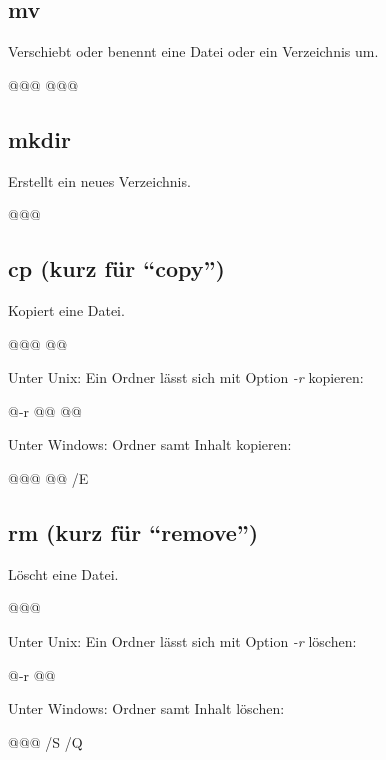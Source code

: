 \subsection{mv}
Verschiebt oder benennt eine Datei oder ein Verzeichnis um.
\begin{commandshell}
@\shellprefix@mv @\textit{}@
@\shellprefix@mv @\textit{}@
\end{commandshell}

\subsection{mkdir}
Erstellt ein neues Verzeichnis.
\begin{commandshell}
    @\shellprefix@mkdir @\textit{}@
\end{commandshell}

\subsection{cp (kurz für \enquote{copy})}
Kopiert eine Datei.
\begin{commandshell}
    @\shellprefix@cp @\textit{}@ @\textit{}@
\end{commandshell}
Unter Unix: Ein Ordner lässt sich mit Option \textit{-r} kopieren:
\begin{commandshell}
    @\shellprefix@cp -r @\textit{}@ @\textit{}@
\end{commandshell}
Unter Windows: Ordner samt Inhalt kopieren:
\begin{commandshell}[][minted language=batch]
    @\shellprefix@xcopy @\textit{}@ @\textit{}@ /E
\end{commandshell}

\subsection{rm (kurz für \enquote{remove})}
Löscht eine Datei.
\begin{commandshell}
    @\shellprefix@rm @\textit{}@
\end{commandshell}
Unter Unix: Ein Ordner lässt sich mit Option \textit{-r} löschen:
\begin{commandshell}
    @\shellprefix@rm -r @\textit{}@
\end{commandshell}
Unter Windows: Ordner samt Inhalt löschen:
\begin{commandshell}[][minted language=batch]
    @\shellprefix@rmdir @\textit{}@ /S /Q
\end{commandshell}

